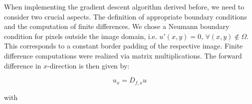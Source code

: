 \documentclass{paper}
\begin{document}
When implementing the gradient descent algorithm derived before, we need to consider two crucial aspects. The definition of appropriate boundary conditions and the computation of finite differences. We chose a Neumann boundary condition for pixels outside the image domain, i.e. \begin{math}u'(x,y)=0, \, \forall(x,y)\notin\Omega\end{math}. This corresponds to a constant border padding of the respective image. Finite difference computations were realized via matrix multiplications. The forward difference in $x$-direction is then given by:

\begin{equation}
u_{x}=D_{f,x}u
\label{eq:differenceX}
\end{equation}

with


\end{document}
